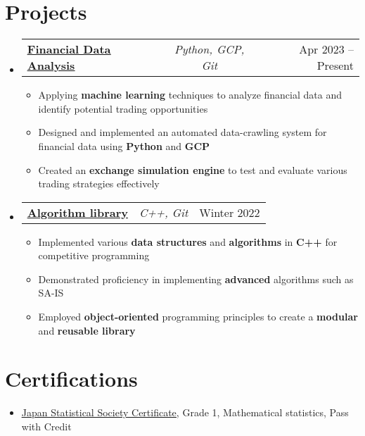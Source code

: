 \documentclass[a4paper,11pt]{article}
\makeatletter
\newcommand{\resumeItem}[1]{
  \item\small{#1}
}
\newcommand{\resumeItemListStart}{\begin{itemize}[rightmargin=0.11in]}
\newcommand{\resumeItemListEnd}{\end{itemize}}
\newcommand{\resumeTrioHeading}[3]{
  \item\small{
    \begin{tabular*}{0.96\textwidth}[t]{
      l@{\extracolsep{\fill}}c@{\extracolsep{\fill}}r
    }
      \textbf{#1} & \textit{#2} & #3
    \end{tabular*}
  }
}
\newcommand{\resumeHeadingListStart}{
  \begin{itemize}[leftmargin=0.15in, label={}]
}
\newcommand{\resumeHeadingListEnd}{\end{itemize}}
\makeatother
\begin{document}

\section{Projects}
\resumeHeadingListStart{}

\resumeTrioHeading{\href{https://github.com/aralsea/btc-data-analysis}{\uline{Financial Data Analysis}}}{Python, GCP, Git}{Apr 2023 -- Present}
\resumeItemListStart{}
\resumeItem{Applying \textbf{machine learning} techniques to analyze financial data and identify potential trading opportunities}
\resumeItem{Designed and implemented an automated data-crawling system for financial data using \textbf{Python} and \textbf{GCP}}
\resumeItem{Created an \textbf{exchange simulation engine} to test and evaluate various trading strategies effectively}
\resumeItemListEnd{}

\resumeTrioHeading{\href{https://github.com/aralsea/cpp-library}{\uline{Algorithm library}}}{C++, Git}{Winter 2022}
\resumeItemListStart{}
\resumeItem{Implemented various \textbf{data structures} and \textbf{algorithms} in \textbf{C++} for competitive programming}
\resumeItem{Demonstrated proficiency in implementing \textbf{advanced} algorithms such as SA-IS}
\resumeItem{Employed \textbf{object-oriented} programming principles to create a \textbf{modular} and \textbf{reusable library}}
\resumeItemListEnd{}

\resumeHeadingListEnd{}



\section{Certifications}
\resumeItemListStart{}
\resumeItem{\href{https://www.toukei-kentei.jp/}{\uline{Japan Statistical Society Certificate}}, Grade 1, Mathematical statistics, Pass with Credit}
\resumeItemListEnd{}
\end{document}
